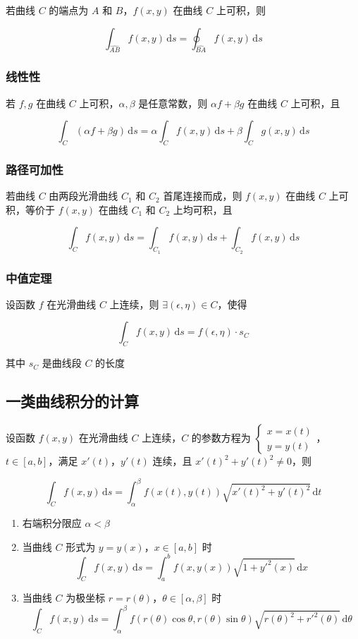 \documentclass[lang = zh , final , oneside , openany , titlepage , zihao = -4 , linespread = 1.3 , baselineskip = false , cjk-font = windows , text-font = newtx , math-font = newtx , math-style = ISO , uppercase-greek = upright , integral-limits = false]{sjtureport}
\begin{document}
若曲线 \(C\) 的端点为 \(A\) 和 \(B\)，\(f(x,y)\) 在曲线 \(C\) 上可积，则

\[\int_{\widehat{AB}} f(x,y)\,\mathrm{d}s=\oint_{\widehat{BA}} f(x,y)\,\mathrm{d}s\]

\subsubsection{线性性}

若 \(f,g\) 在曲线 \(C\) 上可积，\(\alpha , \beta\) 是任意常数，则
\(\alpha f + \beta g\) 在曲线 \(C\) 上可积，且

\[\int_C (\alpha f + \beta g)\,\mathrm{d}s = \alpha \int_C f(x,y)\,\mathrm{d}s + \beta \int_C g(x,y)\,\mathrm{d}s\]

\subsubsection{路径可加性}

若曲线 \(C\) 由两段光滑曲线 \(C_1\) 和 \(C_2\) 首尾连接而成，则
\(f(x,y)\) 在曲线 \(C\) 上可积，等价于 \(f(x,y)\) 在曲线 \(C_1\) 和
\(C_2\) 上均可积，且

\[\int_C f(x,y)\,\mathrm{d}s = \int_{C_1} f(x,y)\,\mathrm{d}s + \int_{C_2} f(x,y)\,\mathrm{d}s\]

\subsubsection{中值定理}

设函数 \(f\) 在光滑曲线 \(C\) 上连续，则
\(\exists (\epsilon,\eta)\in C\)，使得

\[\int_C f(x,y)\,\mathrm{d}s = f(\epsilon,\eta)\cdot s_C\]

其中 \(s_C\) 是曲线段 \(C\) 的长度

\subsection{一类曲线积分的计算}

设函数 \(f(x,y)\) 在光滑曲线 \(C\) 上连续，\(C\) 的参数方程为
\(\begin{cases}x=x(t)\\y=y(t)\end{cases}\)，\(t\in [a,b]\)，满足
\(x'(t)\)，\(y'(t)\) 连续，且 \(x'(t)^2 + y'(t)^2 \neq 0\)，则

\[\int_C f(x,y)\,\mathrm{d}s = \int_\alpha^\beta f(x(t),y(t))\sqrt{x'(t)^2 + y'(t)^2}\,\mathrm{d}t\]

\begin{enumerate}
\item
  右端积分限应 \(\alpha < \beta\)
\item
  当曲线 \(C\) 形式为 \(y=y(x)\)，\(x\in [a,b]\) 时
  \[\displaystyle\int_Cf(x,y)\,\mathrm{d}s =\int_a^bf(x,y(x))\sqrt{1+y'^2(x)}\,\mathrm{d}x\]
\item
  当曲线 \(C\) 为极坐标 \(r=r(\theta)\)，\(\theta\in [\alpha,\beta]\)
  时
  \[\displaystyle\int_Cf(x,y)\,\mathrm{d}s = \int_\alpha^\beta f(r(\theta)\cos\theta,r(\theta)\sin\theta)\sqrt{r(\theta)^2+r'^2(\theta)}\,\mathrm{d}\theta\]
\end{enumerate}
\end{document}
